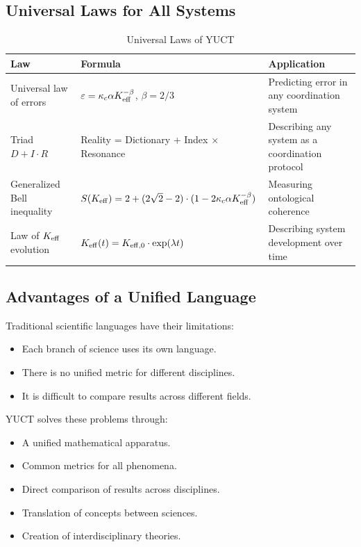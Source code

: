 \documentclass[12pt,a4paper]{article}
\begin{document}
	\subsection{Universal Laws for All Systems}
	
	\begin{table}[H]
		\centering
		\caption{Universal Laws of YUCT}
		\label{tab:universal-laws}
		\begin{tabular}{p{5cm}p{6cm}p{5cm}}
			\toprule
			\textbf{Law} & \textbf{Formula} & \textbf{Application} \\
			\midrule
			Universal law of errors & \(\varepsilon = \kappa_c \alpha \Keff^{-\beta}\), \(\beta = 2/3\) & Predicting error in any coordination system \\
			Triad \(D + I \cdot R\) & Reality = Dictionary + Index × Resonance & Describing any system as a coordination protocol \\
			Generalized Bell inequality & \(S(\Keff) = 2 + (2\sqrt{2}-2)\cdot(1 - 2\kappa_c \alpha \Keff^{-\beta})\) & Measuring ontological coherence \\
			Law of \(\Keff\) evolution & \(\Keff(t) = \Keff[0] \cdot \exp(\lambda t)\) & Describing system development over time \\
			\bottomrule
		\end{tabular}
	\end{table}
	
	\subsection{Advantages of a Unified Language}
	
	Traditional scientific languages have their limitations:
	\begin{itemize}
		\item Each branch of science uses its own language.
		\item There is no unified metric for different disciplines.
		\item It is difficult to compare results across different fields.
	\end{itemize}
	
	YUCT solves these problems through:
	\begin{itemize}
		\item A unified mathematical apparatus.
		\item Common metrics for all phenomena.
		\item Direct comparison of results across disciplines.
		\item Translation of concepts between sciences.
		\item Creation of interdisciplinary theories.
	\end{itemize}
	
\end{document}
